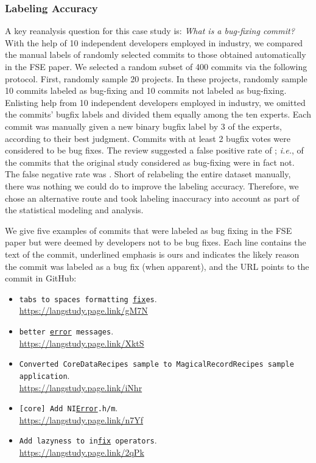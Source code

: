 \documentclass[acmsmall]{acmart}
\newcommand{\gh}{{GitHub}\xspace}
\newcommand{\ie}{\emph{i.e.}\xspace}
\begin{document}
\subsubsection{Labeling Accuracy}\label{falselabels}

A key reanalysis question for this case study is: {\it What is a bug-fixing
  commit?}  With the help of 10 independent developers employed in industry,
we compared the manual labels of randomly selected commits to those obtained
automatically in the FSE paper.  We selected a random subset of 400 commits
via the following protocol. First, randomly sample 20 projects. In these
projects, randomly sample 10 commits labeled as bug-fixing and 10 commits
not labeled as bug-fixing. Enlisting help from 10 independent developers
employed in industry, we omitted the commits' bugfix labels and divided them 
equally among the ten experts. Each commit was manually given a new binary 
bugfix label by 3 of the experts, according to their best judgment. Commits
with at least 2 bugfix votes were considered to be bug fixes.  The review
suggested a false positive rate of \commitsFalsePositives; \ie, \commitsFalsePositives of the commits that the
original study considered as bug-fixing were in fact not. The false negative
rate was \commitsFalseNegatives.  Short of relabeling the entire dataset manually, there was
nothing we could do to improve the labeling accuracy. Therefore, we chose an
alternative route and took labeling inaccuracy into account as part of the
statistical modeling and analysis.

We give five examples of commits that were labeled as bug fixing in the FSE
paper but were deemed by developers not to be bug fixes. Each line contains
the text of the commit, underlined emphasis is ours and indicates the likely
reason the commit was labeled as a bug fix (when apparent), and the URL points to the commit in
\gh:
\begin{itemize}
\item {\tt tabs to spaces formatting \underline{fix}es}.\\ {\small\sf\url{https://langstudy.page.link/gM7N}} 
\item {\tt better \underline{error} messages}.\\ {\small\sf \url{https://langstudy.page.link/XktS}}
\item {\tt Converted   CoreDataRecipes sample to MagicalRecordRecipes sample application}.\\
 {\small\sf \url{https://langstudy.page.link/iNhr}}
\item {\tt [core] Add  NI\underline{Error}.h/m}.\\{\small\sf\url{https://langstudy.page.link/n7Yf}}
\item {\tt Add lazyness to in\underline{fix} operators}.\\{\small\sf\url{https://langstudy.page.link/2qPk}}
\end{itemize}
\end{document}
